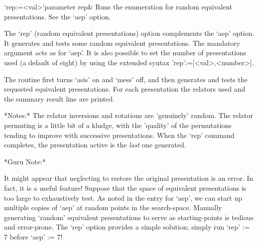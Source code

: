 \beginitems

\>`rep:=<val>'{parameter rep}&
Runs the enumeration for random equivalent presentations. See the `aep'
option.

\enditems

The  `rep' (random  equivalent presentations)  option  complements the
`aep'  option.    It  generates  and  tests   some  random  equivalent
presentations.  The mandatory argument acts  as for `aep'.  It is also
possible to set the number  of presentations used (a default of eight)
by using the extended syntax 'rep':=[<val>,<number>].

The routine first  turns `asis' on and `mess'  off, and then generates
and   tests  the   requested  equivalent   presentations.    For  each
presentation  the  relators  used  and  the summary  result  line  are
printed.

*Notes:*
The  relator inversions  and  rotations are  'genuinely' random.   The
relator permuting is  a little bit of a kludge,  with the 'quality' of
the  permutations tending  to improve  with  successive presentations.
When the `rep' command completes,  the presentation active is the {\it
last} one generated.

*Guru Note:*

It might  appear that neglecting to restore  the original presentation
is an error.  In fact, it is a useful feature!  Suppose that the space
of  equivalent presentations is  too large  to exhaustively  test.  As
noted in the  entry for `aep', we can start  up multiple copies of
`aep'  at  random points  in  the  search-space.  Manually  generating
`random'  equivalent  presentations  to  serve as  starting-points  is
tedious and error-prone.  The `rep' option provides a simple solution;
simply run `rep' := $7$ before `aep' := $7$!



